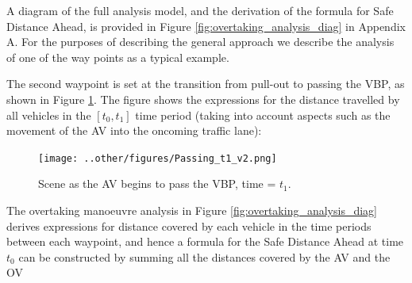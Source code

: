 A diagram of the full analysis model, and the derivation of the formula for Safe Distance Ahead, is provided in Figure \ref{fig:overtaking_analysis_diag} in Appendix A. For the purposes of describing the general approach we describe the analysis of one of the way points as a typical example. 

The second waypoint is set at the transition from pull-out to passing the VBP, as shown in Figure \ref{fig:Passing_t1}. The figure shows the expressions for the distance travelled by all vehicles in the \textit{$[t_0, t_1]$} time period (taking into account aspects such as the movement of the AV into the oncoming traffic lane):
 \begin{figure}
    \centering
    \texttt{[image: ..other/figures/Passing\_t1\_v2.png]}
    \caption{Scene as the AV begins to pass the VBP, time = $t_1$.}
    \label{fig:Passing_t1}
 \end{figure}

The overtaking manoeuvre analysis in Figure \ref{fig:overtaking_analysis_diag} derives expressions for distance covered by each vehicle in the time periods between each waypoint, and hence a formula for the Safe Distance Ahead at time $t_0$ can be constructed by summing all the distances covered by the AV and the OV

